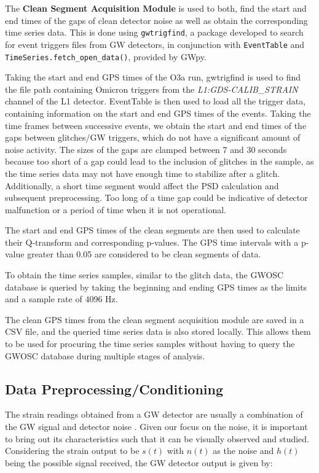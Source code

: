 \documentclass[12pt]{article}
\begin{document}
\noindent The \textbf{Clean Segment Acquisition Module} is used to both, find the start and end times of the gaps of clean detector noise as well as obtain the corresponding time series data. This is done using \texttt{gwtrigfind}, a package developed to search for event triggers files from GW detectors, in conjunction with \texttt{EventTable} and \texttt{TimeSeries.fetch\_open\_data()}, provided by GWpy.

\medskip
\noindent Taking the start and end GPS times of the O3a run, gwtrigfind is used to find the file path containing Omicron triggers from the \textit{L1:GDS-CALIB\_STRAIN} channel of the L1 detector. EventTable is then used to load all the trigger data, containing information on the start and end GPS times of the events. Taking the time frames between successive events, we obtain the start and end times of the gaps between glitches/GW triggers, which do not have a significant amount of noise activity. The sizes of the gaps are clamped between 7 and 30 seconds because too short of a gap could lead to the inclusion of glitches in the sample, as the time series data may not have enough time to stabilize after a glitch. Additionally, a short time segment would affect the PSD calculation and subsequent preprocessing. Too long of a time gap could be indicative of detector malfunction or a period of time when it is not operational.

\medskip
\noindent The start and end GPS times of the clean segments are then used to calculate their Q-transform and corresponding p-values. The GPS time intervals with a p-value greater than 0.05 are considered to be clean segments of data.

\medskip
\noindent To obtain the time series samples, similar to the glitch data, the GWOSC database is queried by taking the beginning and ending GPS times as the limits and a sample rate of 4096 Hz.

\medskip
\noindent The clean GPS times from the clean segment acquisition module are saved in a CSV file, and the queried time series data is also stored locally. This allows them to be used for procuring the time series samples without having to query the GWOSC database during multiple stages of analysis.

\subsection{Data Preprocessing/Conditioning}\label{DataConditioning}

\noindent The strain readings obtained from a GW detector are usually a combination of the GW signal and detector noise \cite{cutler_gravitational_1994, moore_gravitational-wave_2015, Li:2013lza}. Given our focus on the noise, it is important to bring out its characteristics such that it can be visually observed and studied. Considering the strain output to be $s(t)$ with $n(t)$ as the noise and $h(t)$ being the possible signal received, the GW detector output is given by:
\end{document}

